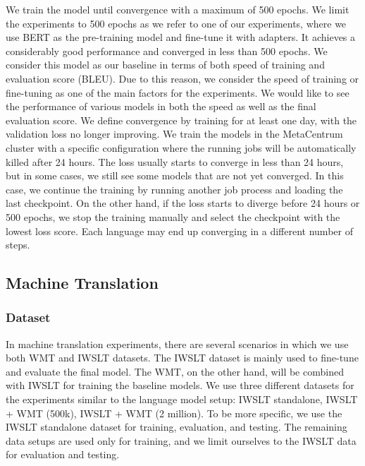 We train the model until convergence with a maximum of 500 epochs. 
We limit the experiments to 500 epochs as we refer to one of our experiments, where we use BERT as the pre-training model and fine-tune it with adapters. It achieves a considerably good performance and converged in less than 500 epochs. We consider this model as our baseline in terms of both speed of training and evaluation score (BLEU). Due to this reason, we consider the speed of training or fine-tuning as one of the main factors for the experiments. We would like to see the performance of various models in both the speed as well as the final evaluation score.
We define convergence by training for at least one day, with the validation loss no longer improving. We train the models in the MetaCentrum cluster with a specific configuration where the running jobs will be automatically killed after 24 hours. The loss usually starts to converge in less than 24 hours, but in some cases, we still see some models that are not yet converged. In this case, we continue the training by running another job process and loading the last checkpoint. On the other hand, if the loss starts to diverge before 24 hours or 500 epochs, we stop the training manually and select the checkpoint with the lowest loss score. Each language may end up converging in a different number of steps.

\subsection{Machine Translation}
\subsubsection{Dataset}
In machine translation experiments, there are several scenarios in which we use both WMT and IWSLT datasets. The IWSLT dataset is mainly used to fine-tune and evaluate the final model. The WMT, on the other hand, will be combined with IWSLT for training the baseline models. We use three different datasets for the experiments similar to the language model setup: IWSLT standalone, IWSLT + WMT (500k), IWSLT + WMT (2 million). To be more specific, we use the IWSLT standalone dataset for training, evaluation, and testing. The remaining data setups are used only for training, and we limit ourselves to the IWSLT data for evaluation and testing.

